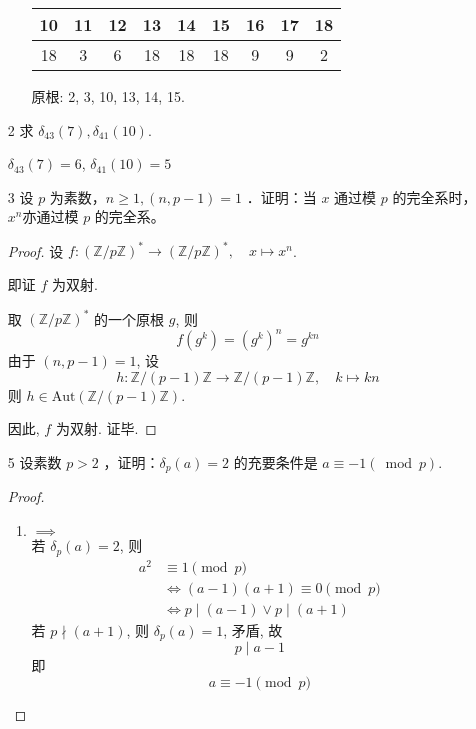 \begin{enumerate}
\begin{solution}
\begin{enumerate}
\begin{center}
            \begin{tabular}{|*{9}{c|}}
            \hline
            10 & 11 & 12 & 13 & 14 & 15 & 16 & 17 & 18 \\
            \hline
            18 & 3 & 6 & 18 & 18 & 18 & 9 & 9 & 2 \\
            \hline
            \end{tabular}
            \end{center}
            原根: 2, 3, 10, 13, 14, 15.
    \end{enumerate}
\end{solution}

    \item[2] 求 $\delta_{43}(7), \delta_{41}(10).$

    \begin{solution}
        $\delta_{43}(7) = 6$, $\delta_{41}(10) = 5$
    \end{solution}

    \item[3] 设 $p$ 为素数，$n \geqslant 1,(n, p-1)=1$ ．证明：当 $x$ 通过模 $p$ 的完全系时，$x^n$亦通过模 $p$ 的完全系。

\begin{proof}

设 $f: (\mathbb{Z}/p\mathbb{Z})^* \longrightarrow (\mathbb{Z}/p\mathbb{Z})^*, \quad x \mapsto x^n$.

即证 $f$ 为双射.

取 $(\mathbb{Z}/p\mathbb{Z})^*$ 的一个原根 $g$, 则
\[
f(g^k) = (g^k)^n = g^{kn}
\]
由于 $(n, p-1)=1$, 设
\[
h: \mathbb{Z}/(p-1)\mathbb{Z} \longrightarrow \mathbb{Z}/(p-1)\mathbb{Z}, \quad k \mapsto kn
\]
则 $h \in \text{Aut}(\mathbb{Z}/(p-1)\mathbb{Z})$.

因此, $f$ 为双射. 证毕.
\end{proof}

    \item[5] 设素数 $p>2$ ，证明：$\delta_p(a)=2$ 的充要条件是 $a \equiv-1(\bmod p).$

\begin{proof}
    \begin{enumerate}
        \item {}$\implies$ \\
        若 $\delta_p(a) = 2$, 则
        \begin{align*}
        a^2 &\equiv 1 \pmod p \\
        &\iff (a-1)(a+1) \equiv 0 \pmod p \\
        &\iff p \mid (a-1) \lor p \mid (a+1)
        \end{align*}
        若 $p \nmid (a+1)$, 则 $\delta_p(a)=1$, 矛盾, 故
        \[ p \mid a-1 \]
        即
        \[ a \equiv -1 \pmod p \]


\end{enumerate}
\end{proof}
\end{enumerate}

